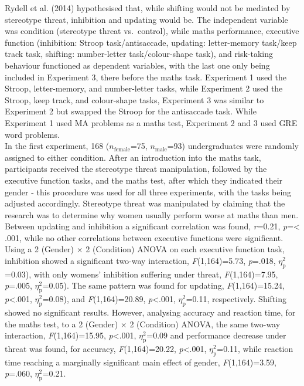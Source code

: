 \documentclass[
  stu,floatsintext]{apa7}
\begin{document}
Rydell et al. (2014) hypothesised that, while shifting would not be mediated by stereotype threat, inhibition and updating would be.
The independent variable was condition (stereotype threat vs.~control), while maths performance, executive function (inhibition: Stroop task/antisaccade, updating: letter-memory task/keep track task, shifting: number-letter task/colour-shape task), and risk-taking behaviour functioned as dependent variables, with the last one only being included in Experiment 3, there before the maths task.
Experiment 1 used the Stroop, letter-memory, and number-letter tasks, while Experiment 2 used the Stroop, keep track, and colour-shape tasks, Experiment 3 was similar to Experiment 2 but swapped the Stroop for the antisaccade task.
While Experiment 1 used MA problems as a maths test, Experiment 2 and 3 used GRE word problems.\\
In the first experiment, 168 (\(n_{\text{female}}\)=75, \(n_{\text{male}}\)=93) undergraduates were randomly assigned to either condition.
After an introduction into the maths task, participants received the stereotype threat manipulation, followed by the executive function tasks, and the maths test, after which they indicated their gender - this procedure was used for all three experiments, with the tasks being adjusted accordingly.
Stereotype threat was manipulated by claiming that the research was to determine why women usually perform worse at maths than men.\\
Between updating and inhibition a significant correlation was found, \emph{r}=0.21, \emph{p}=\textless{} .001, while no other correlations between executive functions were significant.
Using a 2 (Gender) \(\times\) 2 (Condition) ANOVA on each executive function task, inhibition showed a significant two-way interaction, \emph{F}(1,164)=5.73, \emph{p}=.018, \(\eta^{2}_{\text{p}}\)=0.03), with only womens' inhibition suffering under threat, \emph{F}(1,164)=7.95, \emph{p}=.005, \(\eta^{2}_{\text{p}}\)=0.05).
The same pattern was found for updating, \emph{F}(1,164)=15.24, \emph{p}\textless.001, \(\eta^{2}_{\text{p}}\)=0.08), and \emph{F}(1,164)=20.89, \emph{p}\textless.001, \(\eta^{2}_{\text{p}}\)=0.11, respectively.
Shifting showed no significant results.
However, analysing accuracy and reaction time, for the maths test, to a 2 (Gender) \(\times\) 2 (Condition) ANOVA, the same two-way interaction, \emph{F}(1,164)=15.95, \emph{p}\textless.001, \(\eta^{2}_{\text{p}}\)=0.09 and performance decrease under threat was found, for accuracy, \emph{F}(1,164)=20.22, \emph{p}\textless.001, \(\eta^{2}_{\text{p}}\)=0.11, while reaction time reaching a marginally significant main effect of gender, \emph{F}(1,164)=3.59, \emph{p}=.060, \(\eta^{2}_{\text{p}}\)=0.21.
\end{document}
